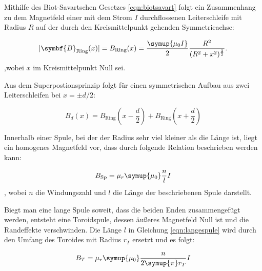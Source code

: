 Mithilfe des Biot-Savartschen Gesetzes \eqref{eqn:biotsavart} folgt ein Zusammenhang zu dem Magnetfeld einer mit dem Strom $I$ durchflossenen 
Leiterschleife mit Radius $R$ auf der durch den Kreismittelpunkt gehenden Symmetrieachse:

\begin{equation}
    \lvert\symbf{B}_\text{Ring}(x)\rvert = B_\text{Ring}(x) = \frac{\symup{\mu_0 I}}{2} \frac{R^2}{(R^2 + x^2)^{\frac{3}{2}}}.
    \label{eqn:ring}
\end{equation}
,wobei $x$ im Kreismittelpunkt Null sei.

Aus dem Superpostionsprinzip folgt für einen symmetrischen Aufbau aus zwei Leiterschleifen bei $x=\pm d / 2 $:

\begin{equation}
    B_d(x)=B_\text{Ring}(x-\frac{d}{2}) + B_\text{Ring}(x+\frac{d}{2})
    \label{eqn:2ringe}
\end{equation}

Innerhalb einer Spule, bei der der Radius sehr viel kleiner als die Länge ist, liegt ein homogenes Magnetfeld vor, dass durch folgende
Relation beschrieben werden kann:

\begin{equation}
    B_\text{Sp} = \mu_r \symup{\mu_0} \frac{n}{l} I
    \label{eqn:langespule}
\end{equation}
, wobei $n$ die Windungszahl und $l$ die Länge der beschriebenen Spule darstellt.

Biegt man eine lange Spule soweit, dass die beiden Enden zusammengefügt werden, entsteht eine Toroidspule, dessen äußeres Magnetfeld Null ist und die
Randeffekte verschwinden. Die Länge $l$ in Gleichung \eqref{eqn:langespule} wird durch den Umfang des Toroides mit Radius
$r_T$ ersetzt und es folgt:

\begin{equation}
    B_T=\mu_r \symup{\mu_0} \frac{n}{2 \symup{\pi} r_T} I
    \label{eqn:toroid}
\end{equation}


\cite{sample}